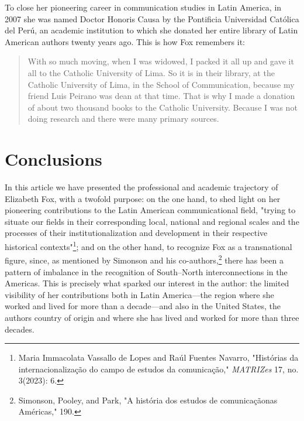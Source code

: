 \documentclass{tufte-handout}
\begin{document}
\noindent To close her pioneering career in communication studies in Latin
America, in 2007 she was named Doctor Honoris Causa by the Pontificia
Universidad Católica del Perú, an academic institution to which she
donated her entire library of Latin American authors twenty years ago.
This is how Fox remembers it:

\begin{quote}
With so much moving, when I was widowed, I packed it all up and gave it
all to the Catholic University of Lima. So it is in their library, at
the Catholic University of Lima, in the School of Communication, because
my friend Luis Peirano was dean at that time. That is why I made a
donation of about two thousand books to the Catholic University. Because
I was not doing research and there were many primary sources.
\end{quote}

\hypertarget{conclusions}{%
\section{Conclusions}\label{conclusions}}

In this article we have presented the professional and academic
trajectory of Elizabeth Fox, with a twofold purpose: on the one hand, to
shed light on her pioneering contributions to the Latin American
communicational field, "trying to situate our fields in their
corresponding local, national and regional scales and the processes of
their institutionalization and development in their respective
historical contexts"\footnote{Maria Immacolata Vassallo de Lopes and
  Raúl Fuentes Navarro, "Histórias da internacionalização do campo de
  estudos da comunicação," \emph{MATRIZes} 17, no. 3(2023): 6.}; and on
the other hand, to recognize Fox as a transnational figure, since, as
mentioned by Simonson and his co-authors,\footnote{Simonson, Pooley, and
  Park, "A história dos estudos de comunicaçãonas Américas," 190.} there
has been a pattern of imbalance in the recognition of South--North
interconnections in the Americas. This is precisely what sparked our
interest in the author: the limited visibility of her contributions both
in Latin America---the region where she worked and lived for more than a
decade---and also in the United States, the author\textquotesingle s
country of origin and where she has lived and worked for more than three
decades.
\end{document}
